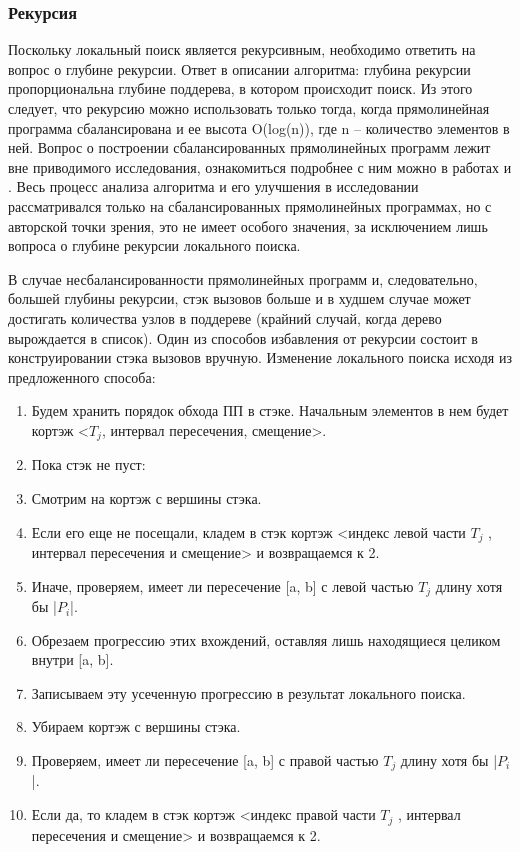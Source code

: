 \documentclass[14pt]{article}
\begin{document}
\subsubsection{Рекурсия}
Поскольку локальный поиск является рекурсивным, необходимо ответить на вопрос о глубине рекурсии. Ответ в описании алгоритма: глубина рекурсии пропорциональна глубине поддерева, в котором происходит поиск. Из этого следует, что рекурсию можно использовать только тогда, когда прямолинейная программа сбалансирована и ее высота O(log(n)), где n -- количество элементов в ней. Вопрос о построении сбалансированных прямолинейных программ лежит вне приводимого исследования, ознакомиться подробнее с ним можно в работах \cite{Ritter} и \cite{ModernRytterAlgorithm}. Весь процесс анализа алгоритма и его улучшения в исследовании рассматривался только на сбалансированных прямолинейных программах, но с авторской точки зрения, это не имеет особого значения, за исключением лишь вопроса о глубине рекурсии локального поиска. 

В случае несбалансированности прямолинейных программ и, следовательно, большей глубины рекурсии, стэк вызовов больше и в худшем случае может достигать количества узлов в поддереве (крайний случай, когда дерево вырождается в список). Один из способов избавления от рекурсии состоит в конструировании стэка вызовов вручную. Изменение локального поиска исходя из предложенного способа:
\begin{enumerate}
	\item Будем хранить порядок обхода ПП в стэке. Начальным элементов в нем будет кортэж <$T_j$, интервал пересечения, смещение>. 
	\item Пока стэк не пуст:
	\item Смотрим на кортэж с вершины стэка.
	\item Если его еще не посещали, кладем в стэк кортэж <индекс левой части $T_j$ , интервал пересечения и смещение> и возвращаемся к 2.
	\item Иначе, проверяем, имеет ли пересечение [a, b] с левой частью $T_j$
длину хотя бы |$P_i$|. 	
	\item Обрезаем прогрессию этих вхождений, оставляя лишь находящиеся целиком внутри [a, b].
	\item Записываем эту усеченную прогрессию в результат локального поиска.
	\item Убираем кортэж с вершины стэка.	
	\item Проверяем, имеет ли пересечение [a, b] с правой частью $T_j$
длину хотя бы |$P_i$|.
	\item Если да, то кладем в стэк кортэж <индекс правой части $T_j$ , интервал пересечения и смещение> и возвращаемся к 2.
\end{enumerate}
\end{document}
